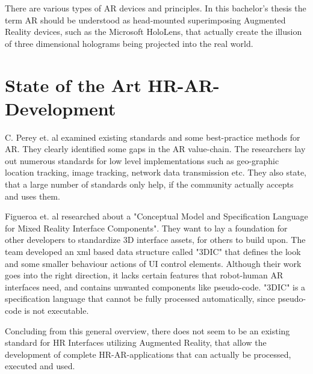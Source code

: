 There are various types of AR devices and principles. In this bachelor's thesis the term AR should be understood as head-mounted superimposing Augmented Reality devices, such as the Microsoft HoloLens, that actually create the illusion of three dimensional holograms being projected into the real world.


\section{State of the Art HR-AR-Development}

C. Perey et. al \cite{perey2011current} examined existing standards and some best-practice methods for AR. They clearly identified some gaps in the AR value-chain. The researchers lay out numerous standards for low level implementations such as geo-graphic location tracking, image tracking, network data transmission etc. They also state, that a large number of standards only help, if the community actually accepts and uses them.

Figueroa et. al \cite{figueroa2006conceptual} researched about a "Conceptual Model and Specification Language for Mixed Reality Interface Components". They want to lay a foundation for other developers to standardize 3D interface assets, for others to build upon. The team developed an xml based data structure called "3DIC" that defines the look and some smaller behaviour actions of UI control elements. Although their work goes into the right direction, it lacks certain features that robot-human AR interfaces need, and contains unwanted components like pseudo-code. "3DIC" is a specification language that cannot be fully processed automatically, since pseudo-code is not executable. 

Concluding from this general overview, there does not seem to be an existing standard for HR Interfaces utilizing Augmented Reality, that allow the development of complete HR-AR-applications that can actually be processed, executed and used. 
























